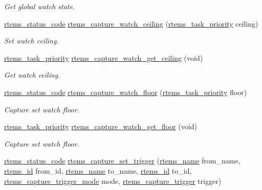 \begin{DoxyCompactItemize}
\begin{DoxyCompactList}\small\item\em Get global watch state. \end{DoxyCompactList}\item 
\mbox{\hyperlink{group__ClassicStatus_ga545d41846817eaba6143d52ee4d9e9fe}{rtems\+\_\+status\+\_\+code}} \mbox{\hyperlink{group__libmisc__capture_ga002c42e4818a1012b1b172076f6f9883}{rtems\+\_\+capture\+\_\+watch\+\_\+ceiling}} (\mbox{\hyperlink{group__ClassicTasks_gaa80a0c0938307d1e99d0eb5fee765b47}{rtems\+\_\+task\+\_\+priority}} ceiling)
\begin{DoxyCompactList}\small\item\em Set watch ceiling. \end{DoxyCompactList}\item 
\mbox{\hyperlink{group__ClassicTasks_gaa80a0c0938307d1e99d0eb5fee765b47}{rtems\+\_\+task\+\_\+priority}} \mbox{\hyperlink{group__libmisc__capture_ga0d4e2c36e113e9413bd1aacdfe6edfb9}{rtems\+\_\+capture\+\_\+watch\+\_\+get\+\_\+ceiling}} (void)
\begin{DoxyCompactList}\small\item\em Get watch ceiling. \end{DoxyCompactList}\item 
\mbox{\hyperlink{group__ClassicStatus_ga545d41846817eaba6143d52ee4d9e9fe}{rtems\+\_\+status\+\_\+code}} \mbox{\hyperlink{group__libmisc__capture_gacf62dfe7cfdea212a0c0abdb388e968d}{rtems\+\_\+capture\+\_\+watch\+\_\+floor}} (\mbox{\hyperlink{group__ClassicTasks_gaa80a0c0938307d1e99d0eb5fee765b47}{rtems\+\_\+task\+\_\+priority}} floor)
\begin{DoxyCompactList}\small\item\em Capture set watch floor. \end{DoxyCompactList}\item 
\mbox{\hyperlink{group__ClassicTasks_gaa80a0c0938307d1e99d0eb5fee765b47}{rtems\+\_\+task\+\_\+priority}} \mbox{\hyperlink{group__libmisc__capture_ga00a3676efcb328e7de776bcd01f60ee2}{rtems\+\_\+capture\+\_\+watch\+\_\+get\+\_\+floor}} (void)
\begin{DoxyCompactList}\small\item\em Capture set watch floor. \end{DoxyCompactList}\item 
\mbox{\hyperlink{group__ClassicStatus_ga545d41846817eaba6143d52ee4d9e9fe}{rtems\+\_\+status\+\_\+code}} \mbox{\hyperlink{group__libmisc__capture_ga98931dad73347565d0b528bee300df70}{rtems\+\_\+capture\+\_\+set\+\_\+trigger}} (\mbox{\hyperlink{group__ClassicTasks_ga55fb63c49f68c0cbd9bee004da15b1fd}{rtems\+\_\+name}} from\+\_\+name, \mbox{\hyperlink{group__ClassicTasks_gab20892b814dced7dd4e5b9bf42becd57}{rtems\+\_\+id}} from\+\_\+id, \mbox{\hyperlink{group__ClassicTasks_ga55fb63c49f68c0cbd9bee004da15b1fd}{rtems\+\_\+name}} to\+\_\+name, \mbox{\hyperlink{group__ClassicTasks_gab20892b814dced7dd4e5b9bf42becd57}{rtems\+\_\+id}} to\+\_\+id, \mbox{\hyperlink{group__libmisc__capture_ga56557affa8f3021c9d5ed6ebca98f473}{rtems\+\_\+capture\+\_\+trigger\+\_\+mode}} mode, \mbox{\hyperlink{group__libmisc__capture_ga5fd896f3981ec7db204355a0e527a074}{rtems\+\_\+capture\+\_\+trigger}} trigger)

\end{DoxyCompactItemize}
